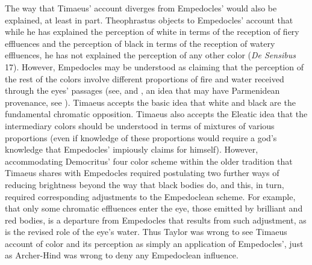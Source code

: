 
The way that Timaeus' account diverges from Empedocles' would also be explained, at least in part. Theophrastus objects to Empedocles' account that while he has explained the perception of white in terms of the reception of fiery effluences and the perception of black in terms of the reception of watery effluences, he has not explained the perception of any other color (\emph{De Sensibus} 17). However, Empedocles may be understood as claiming that the perception of the rest of the colors involve different proportions of fire and water received through the eyes' passages (see, \citealt{Ierodiakonou:2005fk} and \citealt[chapter 5.4]{Kalderon:2015fr}, an idea that may have Parmenidean provenance, see \citealt[5.3]{Kalderon:2015fr}). Timaeus accepts the basic idea that white and black are the fundamental chromatic opposition. Timaeus also accepts the Eleatic idea that the intermediary colors should be understood in terms of mixtures of various proportions (even if knowledge of these proportions would require a god's knowledge that Empedocles' impiously claims for himself). However, accommodating Democritus' four color scheme within the older tradition that Timaeus shares with Empedocles required postulating two further ways of reducing brightness beyond the way that black bodies do, and this, in turn, required corresponding adjustments to the Empedoclean scheme. For example, that only some chromatic effluences enter the eye, those emitted by brilliant and red bodies, is a departure from Empedocles that results from such adjustment, as is the revised role of the eye's water. Thus Taylor was wrong to see Timaeus account of color and its perception as simply an application of Empedocles', just as Archer-Hind was wrong to deny any Empedoclean influence.



